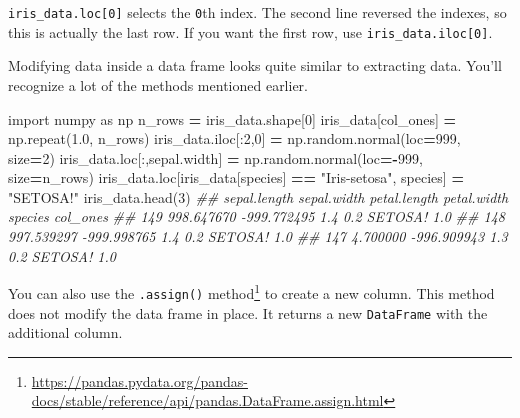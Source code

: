 \documentclass[
  12pt,
  krantz2]{krantz}
\makeatletter
\newenvironment{Shaded}{\begin{snugshade}}{\end{snugshade}}
\newcommand{\CommentTok}[1]{\textcolor[rgb]{0.37,0.37,0.37}{\textit{#1}}}
\newcommand{\DecValTok}[1]{\textcolor[rgb]{0.06,0.06,0.06}{#1}}
\newcommand{\FloatTok}[1]{\textcolor[rgb]{0.06,0.06,0.06}{#1}}
\newcommand{\ImportTok}[1]{#1}
\newcommand{\NormalTok}[1]{#1}
\newcommand{\OperatorTok}[1]{\textcolor[rgb]{0.43,0.43,0.43}{\textbf{#1}}}
\newcommand{\StringTok}[1]{\textcolor[rgb]{0.5,0.5,0.5}{#1}}
\renewcommand{\href}[2]{#2\footnote{\url{#1}}}
\newenvironment{kframe}{%
\medskip{}
\setlength{\fboxsep}{.8em}
 \def\at@end@of@kframe{}%
 \ifinner\ifhmode%
  \def\at@end@of@kframe{\end{minipage}}%
  \begin{minipage}{\columnwidth}%
 \fi\fi%
 \def\FrameCommand##1{\hskip\@totalleftmargin \hskip-\fboxsep
 \colorbox{shadecolor}{##1}\hskip-\fboxsep
     \hskip-\linewidth \hskip-\@totalleftmargin \hskip\columnwidth}%
 \MakeFramed {\advance\hsize-\width
   \@totalleftmargin\z@ \linewidth\hsize
   \@setminipage}}%
 {\par\unskip\endMakeFramed%
 \at@end@of@kframe}
\renewenvironment{Shaded}{\begin{kframe}}{\end{kframe}}
\makeatother
\begin{document}
\texttt{iris\_data.loc{[}0{]}} selects the \texttt{0}th index. The second line reversed the indexes, so this is actually the last row. If you want the first row, use \texttt{iris\_data.iloc{[}0{]}}.

Modifying data inside a data frame looks quite similar to extracting data. You'll recognize a lot of the methods mentioned earlier.

\begin{Shaded}
\begin{Highlighting}[]
\ImportTok{import}\NormalTok{ numpy }\ImportTok{as}\NormalTok{ np}
\NormalTok{n\_rows }\OperatorTok{=}\NormalTok{ iris\_data.shape[}\DecValTok{0}\NormalTok{]}
\NormalTok{iris\_data[}\StringTok{\textquotesingle{}col\_ones\textquotesingle{}}\NormalTok{] }\OperatorTok{=}\NormalTok{ np.repeat(}\FloatTok{1.0}\NormalTok{, n\_rows)}
\NormalTok{iris\_data.iloc[:}\DecValTok{2}\NormalTok{,}\DecValTok{0}\NormalTok{] }\OperatorTok{=}\NormalTok{  np.random.normal(loc}\OperatorTok{=}\DecValTok{999}\NormalTok{, size}\OperatorTok{=}\DecValTok{2}\NormalTok{)}
\NormalTok{iris\_data.loc[:,}\StringTok{\textquotesingle{}sepal.width\textquotesingle{}}\NormalTok{] }\OperatorTok{=}\NormalTok{ np.random.normal(loc}\OperatorTok{={-}}\DecValTok{999}\NormalTok{, size}\OperatorTok{=}\NormalTok{n\_rows)}
\NormalTok{iris\_data.loc[iris\_data[}\StringTok{\textquotesingle{}species\textquotesingle{}}\NormalTok{] }\OperatorTok{==} \StringTok{"Iris{-}setosa"}\NormalTok{, }\StringTok{\textquotesingle{}species\textquotesingle{}}\NormalTok{] }\OperatorTok{=} \StringTok{"SETOSA!"}
\NormalTok{iris\_data.head(}\DecValTok{3}\NormalTok{)}
\CommentTok{\#\#      sepal.length  sepal.width  petal.length  petal.width  species  col\_ones}
\CommentTok{\#\# 149    998.647670  {-}999.772495           1.4          0.2  SETOSA!       1.0}
\CommentTok{\#\# 148    997.539297  {-}999.998765           1.4          0.2  SETOSA!       1.0}
\CommentTok{\#\# 147      4.700000  {-}996.909943           1.3          0.2  SETOSA!       1.0}
\end{Highlighting}
\end{Shaded}

You can also use the \href{https://pandas.pydata.org/pandas-docs/stable/reference/api/pandas.DataFrame.assign.html}{\texttt{.assign()} method} to create a new column. This method does not modify the data frame in place. It returns a new \texttt{DataFrame} with the additional column.
\end{document}
